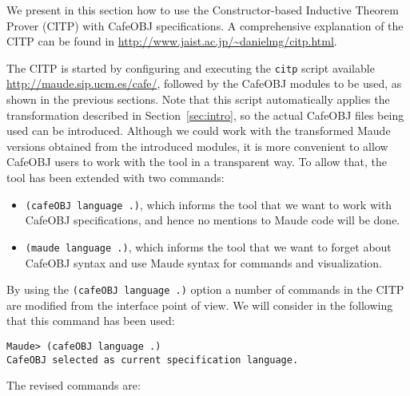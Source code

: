 
We present in this section how to use the Constructor-based Inductive Theorem Prover
(CITP) with CafeOBJ specifications. A comprehensive explanation of the CITP can be
found in \url{http://www.jaist.ac.jp/~danielmg/citp.html}.

The CITP is started by configuring and executing the \verb"citp" script available
\url{http://maude.sip.ucm.es/cafe/}, followed by the CafeOBJ modules to be used,
as shown in the previous sections.
Note that this script automatically applies the transformation described in Section~\ref{sec:intro},
so the actual CafeOBJ files being used can be introduced.
%
Although we could work with the transformed Maude
versions obtained from the introduced modules, it is more convenient to allow CafeOBJ users to
work with the tool in a transparent way. To allow that, the tool has been extended with two commands:
\begin{itemize}
\item
\verb"(cafeOBJ language .)", which informs the tool that we want to work with CafeOBJ
specifications, and hence no mentions to Maude code will be done.

\item
\verb"(maude language .)", which informs the tool that we want to forget about CafeOBJ
syntax and use Maude syntax for commands and visualization.
\end{itemize}

By using the \verb"(cafeOBJ language .)" option a number of commands in the CITP are
modified from the interface point of view. We will consider in the following that
this command has been used:

{\codesize
\begin{verbatim}
Maude> (cafeOBJ language .)
CafeOBJ selected as current specification language.
\end{verbatim}
}

The revised commands are:

